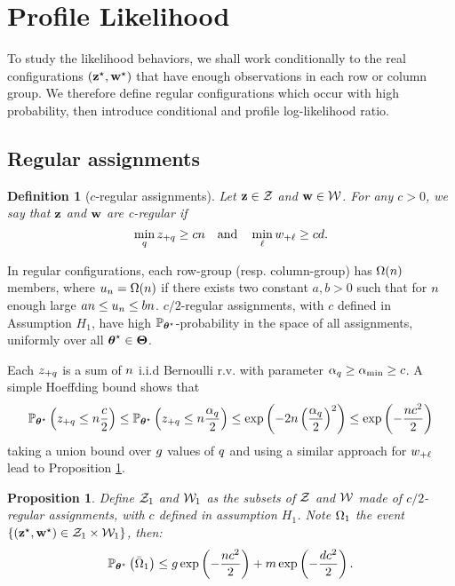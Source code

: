 \documentclass[]{imsart}
\newcommand{\1}{\mathds{1}}
\numberwithin{equation}{section}
\theoremstyle{plain}
\newtheorem{dof}[thm]{Definition}
\newtheorem{proposition}[thm]{Proposition}
\theoremstyle{remark}
\begin{document}
\section{Profile Likelihood}
\label{sec:profile-likelihood}
To study the likelihood behaviors, we shall work conditionally to the real configurations $(\mathbf{z}^\star,\mathbf{w}^\star)$ that have enough observations in each row or column group. We therefore define regular configurations which occur with high probability, then introduce conditional and profile log-likelihood ratio. 
\subsection{Regular assignments}
\begin{dof}[$c$-regular assignments]
  \label{def:regular}
  Let $\mathbf{z} \in \mathcal{Z}$ and $\mathbf{w} \in \mathcal{W}$. For any $c > 0$, we say that $\mathbf{z}$ and $\mathbf{w}$ are c-\emph{regular} if
  \begin{equation}
    \label{eq:regular-configuration}
    \min_{\kk} \zsumk \geq {c\n} \quad \text{and} \quad \min_{\el} \wsuml \geq {c\dd}.
  \end{equation}
\end{dof}



In regular configurations, each row-group (resp. column-group) has $\Omega(n)$ members, where $u_n=\Omega(n)$ if there exists two constant $a, b>0$ such that for $n$ enough large $an \leq u_n \leq bn$. $c/2$-regular assignments, with $c$ defined in Assumption $H_1$, have high  $\mathbb{P}_{\boldsymbol{\theta}^\star}$-probability in the space of all assignments, uniformly over all $\boldsymbol{\theta}^\star \in \boldsymbol{\Theta}$. 

Each $z_{+q}$ is a sum of $n$ i.i.d Bernoulli r.v. with parameter $\alpha_q \geq \alpha_{\min} \geq c$. A simple Hoeffding bound shows that
\begin{equation*}
  \Prob_{\bthetas}\left( \zsumk \leq \n \frac{c}{2} \right)
  \leq
  \Prob_{\bthetas}\left( \zsumk \leq \n \frac{\pik}{2} \right)
  \leq
  \exp\left( - 2\n\left(\frac{\pik}{2}\right)^2 \right)
  \leq
  \exp\left( - \frac{\n c^2}{2} \right)
\end{equation*}
taking a union bound over $g$ values of $q$ and using a similar approach for $w_{+\ell}$ lead to Proposition \ref{cor:prob-regular-configurations-star}.
\begin{proposition}
  \label{cor:prob-regular-configurations-star}
  Define $\mathcal{Z}_1$ and $\mathcal{W}_1$ as the subsets of $\mathcal{Z}$ and $\mathcal{W}$
  made of $c/2$-regular assignments, with $c$ defined in assumption $H_1$. Note $\Omega_1$ the event $\{ (\mathbf{z}^\star, \mathbf{w}^\star)
  \in \mathcal{Z}_1 \times \mathcal{W}_1 \}$, then:
  \begin{equation*}
    \Prob_{\bthetas}\left( \bar{\Om}_1 \right) \leq \g \exp\left( -\frac{\n c^2}{2}\right)+ \m \exp\left( -\frac{\dd c^2}{2}\right).
  \end{equation*}
\end{proposition}
\end{document}
